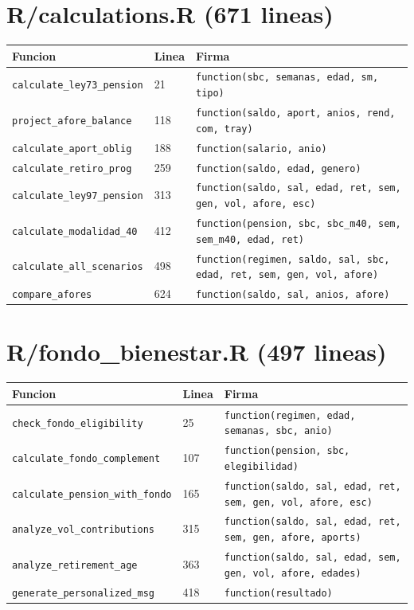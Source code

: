 \documentclass[11pt, letterpaper, twoside]{report}
\begin{document}
\section{R/calculations.R (671 lineas)}

\begin{longtable}{lll}
\toprule
\textbf{Funcion} & \textbf{Linea} & \textbf{Firma} \\
\midrule
\texttt{calculate\_ley73\_pension} & 21 & \texttt{function(sbc, semanas, edad, sm, tipo)} \\
\texttt{project\_afore\_balance} & 118 & \texttt{function(saldo, aport, anios, rend, com, tray)} \\
\texttt{calculate\_aport\_oblig} & 188 & \texttt{function(salario, anio)} \\
\texttt{calculate\_retiro\_prog} & 259 & \texttt{function(saldo, edad, genero)} \\
\texttt{calculate\_ley97\_pension} & 313 & \texttt{function(saldo, sal, edad, ret, sem, gen, vol, afore, esc)} \\
\texttt{calculate\_modalidad\_40} & 412 & \texttt{function(pension, sbc, sbc\_m40, sem, sem\_m40, edad, ret)} \\
\texttt{calculate\_all\_scenarios} & 498 & \texttt{function(regimen, saldo, sal, sbc, edad, ret, sem, gen, vol, afore)} \\
\texttt{compare\_afores} & 624 & \texttt{function(saldo, sal, anios, afore)} \\
\bottomrule
\end{longtable}

\section{R/fondo\_bienestar.R (497 lineas)}

\begin{longtable}{lll}
\toprule
\textbf{Funcion} & \textbf{Linea} & \textbf{Firma} \\
\midrule
\texttt{check\_fondo\_eligibility} & 25 & \texttt{function(regimen, edad, semanas, sbc, anio)} \\
\texttt{calculate\_fondo\_complement} & 107 & \texttt{function(pension, sbc, elegibilidad)} \\
\texttt{calculate\_pension\_with\_fondo} & 165 & \texttt{function(saldo, sal, edad, ret, sem, gen, vol, afore, esc)} \\
\texttt{analyze\_vol\_contributions} & 315 & \texttt{function(saldo, sal, edad, ret, sem, gen, afore, aports)} \\
\texttt{analyze\_retirement\_age} & 363 & \texttt{function(saldo, sal, edad, sem, gen, vol, afore, edades)} \\
\texttt{generate\_personalized\_msg} & 418 & \texttt{function(resultado)} \\
\bottomrule
\end{longtable}


\end{document}
